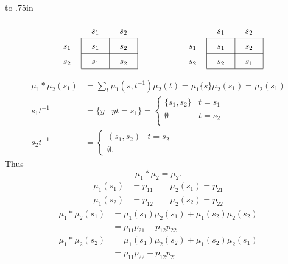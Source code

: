 \vbox to .75in{}

\[
\setlength{\tabcolsep}{12pt}
\renewcommand{\arraystretch}{1.5}
\begin{tabular}{l|c|c|ccl|c|c|} 
	\multicolumn{2}{r}{$s_1$} &\multicolumn{1}{c}{$s_2$}
	&&& \multicolumn{2}{r}{$s_1$}  &\multicolumn{1}{c}{$s_2$}
			\\ \cline{2-3}\cline{7-8}
$s_1$   &$s_1$   &$s_2$   &&&$s_1$ &$s_1$   &$s_2$ \\ \cline{2-3}\cline{7-8}  
$s_2$   &$s_1$   &$s_2$   &&&$s_2$ &$s_2$   &$s_1$ \\ \cline{2-3}\cline{7-8} 

\end{tabular}
\]

\[
\begin{aligned}
       \mu_1 * \mu_2(s_1) &= \sum_t \mu_1(s,t^{-1}) \mu_2(t)
                  = \mu_1\{ s \} \mu_2(s_1) = \mu_2(s_1)       \\
       s_1t^{-1} &= \{ y \mid yt = s_1 \}
                    = \begin{cases}
                         \{ s_1,s_2 \} &t=s_1 \\
                         \emptyset     &t=s_2 \\
                    \end{cases}                                  \\
       s_2t^{-1} &= \begin{cases}
                         (s_1,s_2)  &t=s_2 \\
                         \emptyset.
                    \end{cases}
\end{aligned}
\]
Thus
\[
     \mu_1 * \mu_2 = \mu_2.
\]
\[
\begin{aligned}
       \mu_1(s_1) &= p_{11} \qquad \mu_2(s_1) = p_{21}         \\
       \mu_1(s_2) &= p_{12} \qquad \mu_2(s_2) = p_{22}
\end{aligned}
\]
\[
\begin{aligned}
       \mu_1 * \mu_2(s_1)
          &= \mu_1(s_1) \mu_2(s_1) + \mu_1(s_2) \mu_2(s_2)     \\
          &= p_{11}p_{21} + p_{12}p_{22}                       \\
       \mu_1 * \mu_2(s_2)
          &= \mu_1(s_1) \mu_2(s_2) + \mu_1(s_2) \mu_2(s_1)     \\
          &= p_{11}p_{22} + p_{12}p_{21}
\end{aligned}
\]
